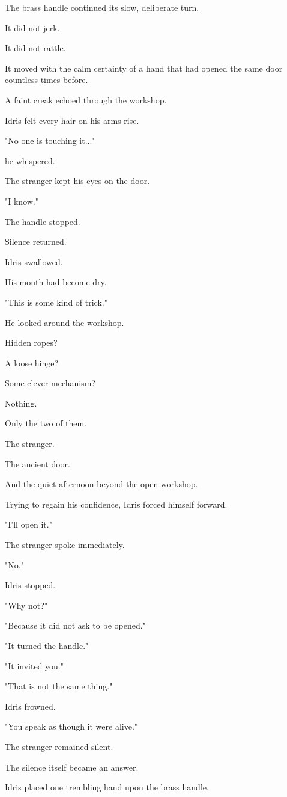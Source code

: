 \documentclass[12pt,openany]{book}
\begin{document}
The brass handle continued its slow, deliberate turn.

It did not jerk.

It did not rattle.

It moved with the calm certainty of a hand that had opened the same door countless times before.

A faint creak echoed through the workshop.

Idris felt every hair on his arms rise.

"No one is touching it..."

he whispered.

The stranger kept his eyes on the door.

"I know."

The handle stopped.

Silence returned.

Idris swallowed.

His mouth had become dry.

"This is some kind of trick."

He looked around the workshop.

Hidden ropes?

A loose hinge?

Some clever mechanism?

Nothing.

Only the two of them.

The stranger.

The ancient door.

And the quiet afternoon beyond the open workshop.

Trying to regain his confidence, Idris forced himself forward.

"I'll open it."

The stranger spoke immediately.

"No."

Idris stopped.

"Why not?"

"Because it did not ask to be opened."

"It turned the handle."

"It invited you."

"That is not the same thing."

Idris frowned.

"You speak as though it were alive."

The stranger remained silent.

The silence itself became an answer.

Idris placed one trembling hand upon the brass handle.
\end{document}
